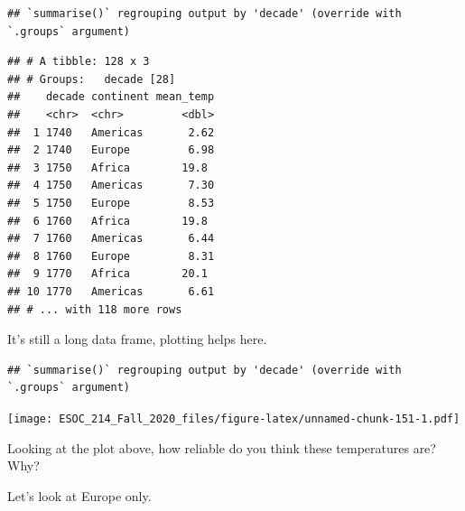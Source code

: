 \documentclass[
]{book}
\newenvironment{Shaded}{\begin{snugshade}}{\end{snugshade}}
\newcommand{\DataTypeTok}[1]{\textcolor[rgb]{0.13,0.29,0.53}{#1}}
\newcommand{\KeywordTok}[1]{\textcolor[rgb]{0.13,0.29,0.53}{\textbf{#1}}}
\newcommand{\NormalTok}[1]{#1}
\newcommand{\OperatorTok}[1]{\textcolor[rgb]{0.81,0.36,0.00}{\textbf{#1}}}
\newcommand{\OtherTok}[1]{\textcolor[rgb]{0.56,0.35,0.01}{#1}}
\newcommand{\StringTok}[1]{\textcolor[rgb]{0.31,0.60,0.02}{#1}}
\begin{document}
\begin{verbatim}
## `summarise()` regrouping output by 'decade' (override with `.groups` argument)
\end{verbatim}

\begin{verbatim}
## # A tibble: 128 x 3
## # Groups:   decade [28]
##    decade continent mean_temp
##    <chr>  <chr>         <dbl>
##  1 1740   Americas       2.62
##  2 1740   Europe         6.98
##  3 1750   Africa        19.8 
##  4 1750   Americas       7.30
##  5 1750   Europe         8.53
##  6 1760   Africa        19.8 
##  7 1760   Americas       6.44
##  8 1760   Europe         8.31
##  9 1770   Africa        20.1 
## 10 1770   Americas       6.61
## # ... with 118 more rows
\end{verbatim}

It's still a long data frame, plotting helps here.

\begin{Shaded}
\end{Shaded}

\begin{verbatim}
## `summarise()` regrouping output by 'decade' (override with `.groups` argument)
\end{verbatim}

\texttt{[image: ESOC\_214\_Fall\_2020\_files/figure-latex/unnamed-chunk-151-1.pdf]}

Looking at the plot above, how reliable do you think these temperatures are? Why?

Let's look at Europe only.

\begin{Shaded}
\end{Shaded}
\end{document}
